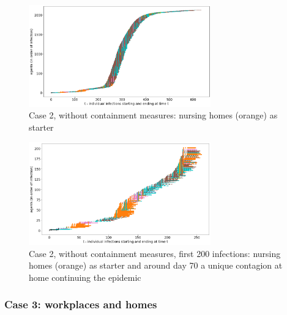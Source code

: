 \documentclass[graybox]{svmult}
\begin{document}
\begin{figure}[t]
\begin{center}
\includegraphics[width=0.7\textwidth]{no4a.png}%

\caption{Case 2, without containment measures: nursing homes (orange) as starter}
\label{4a}
\end{center}
\end{figure}

\begin{figure}[t]
\begin{center}
\includegraphics[width=0.7\textwidth]{no4b.png}%

\caption{Case 2, without containment measures, first 200 infections: nursing homes (orange) as starter and around day 70 a unique contagion at home continuing the epidemic}
\label{4b}
\end{center}
\end{figure}


\subsubsection{Case 3: workplaces and homes}
\label{c3}
\end{document}
